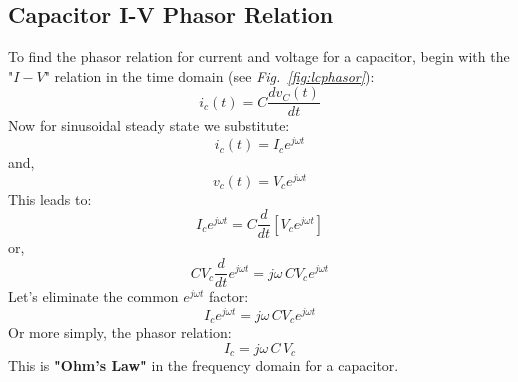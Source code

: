 \subsection{Capacitor I-V Phasor Relation}
To find the phasor relation for current and voltage for a capacitor, begin with the "$I-V$" relation in the time domain (see \emph{Fig.~\ref{fig:lcphasor}}):
    \begin{equation}
        {i_c}(t) = C\frac{{d{v_C}(t)}}{{dt}}
    \end{equation}
Now for sinusoidal steady state we substitute:
    \begin{equation}
        {i_c}(t) = {I_c}{e^{j\omega t}}
    \end{equation}
and,
    \begin{equation}
        {v_c}(t) = {V_c}{e^{j\omega t}}
    \end{equation}
This leads to:
    \begin{equation}
        {I_c}{e^{j\omega t}} = C\frac{d}{{dt}}[{V_c}{e^{j\omega t}}]
    \end{equation}
or,
    \begin{equation}
        C{V_c}\frac{d}{{dt}}{e^{j\omega t}} = j\omega \,C{V_c}{e^{j\omega t}}
    \end{equation}
Let's eliminate the common $e^{j\omega t}$ factor:
    \begin{equation}
        {I_c}{e^{j\omega t}} = j\omega \,C{V_c}{e^{j\omega t}}
    \end{equation}
Or more simply, the phasor relation:
    \begin{equation}
        {I_c} = j\omega \,C\,{V_c}
    \end{equation}
This is \textbf{"Ohm's Law"} in the frequency domain for a capacitor.
\newpage
